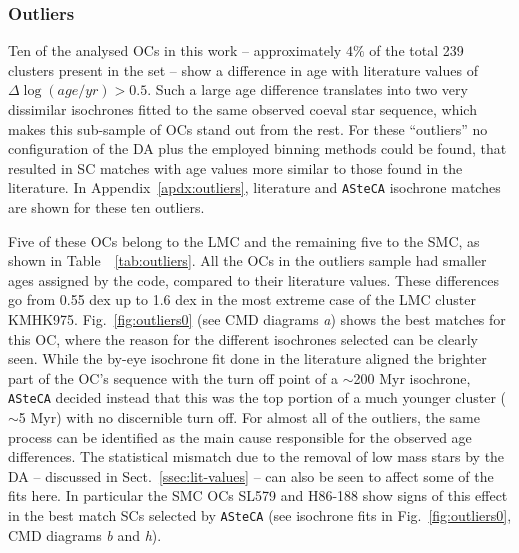 \documentclass[a4paper,fleqn,usenatbib]{mnras}
\begin{document}

\subsubsection{Outliers}
\label{ssec:outliers}

Ten of the analysed OCs in this work -- approximately $4\%$ of the total
239 clusters present in the set -- show a difference in age with literature
values of $\Delta\log(age/yr){>}0.5$.
Such a large age difference translates into two very dissimilar isochrones
fitted to the same observed coeval star sequence, which makes this sub-sample of
OCs stand out from the rest.
%
For these ``outliers'' no configuration of the DA plus the employed binning
methods could be found, that resulted in SC matches with age values
more similar to those found in the literature.
In Appendix~\ref{apdx:outliers}, literature and \texttt{ASteCA} isochrone
matches are shown for these ten outliers.

Five of these OCs belong to the LMC and the remaining five to the SMC,
as shown in Table~~\ref{tab:outliers}.
All the OCs in the outliers sample had smaller ages assigned by the code,
compared to their literature values. These differences go from 0.55
dex up to 1.6 dex in the most extreme case of the LMC cluster KMHK975.
%
Fig.~\ref{fig:outliers0} (see CMD diagrams \emph{a}) shows the best matches for
this OC, where the reason for the different isochrones selected can be clearly
seen. While the by-eye isochrone fit done in the literature aligned the brighter
part of the OC's sequence with the turn off point of a $\sim$200 Myr
isochrone, \texttt{ASteCA} decided instead that this was the top portion of a
much younger cluster ($\sim$5 Myr) with no discernible turn off.
%
For almost all of the outliers, the same process can be identified as the main
cause responsible for the observed age differences.
The statistical mismatch due to the removal of low mass stars by the DA
-- discussed in Sect.~\ref{ssec:lit-values} -- can also be seen to affect some
of the fits here. In particular the SMC OCs SL579 and H86-188 show signs of this
effect in the best match SCs selected by \texttt{ASteCA}
(see isochrone fits in Fig.~\ref{fig:outliers0}, CMD diagrams \emph{b} and
\emph{h}).
\end{document}
